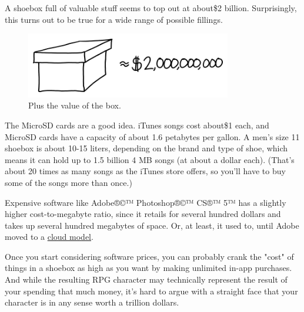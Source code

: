 {\hfill{}

{A shoebox full of valuable stuff seems to top out at about\$2 billion. Surprisingly, this turns out to be true for a wide range of possible fillings.}

\begin{figure}[!htbp]
\centering
\includegraphics[scale=0.5, max width=0.8\textwidth]{imgs/a/108/billion.png}
\caption{Plus the value of the box.}
\end{figure}

{The MicroSD cards are a good idea. iTunes songs cost about\$1 each, and MicroSD cards have a capacity of about 1.6 petabytes per gallon. A men's size 11 shoebox is about 10-15 liters, depending on the brand and type of shoe, which means it can hold up to 1.5 billion 4 MB songs (at about a dollar each). (That's about 20 times as many songs as the iTunes store offers, so you'll have to buy some of the songs more than once.)}

{Expensive software like Adobe®©™ Photoshop®©™ CS®™ 5™ has a slightly higher cost-to-megabyte ratio, since it retails for several hundred dollars and takes up several hundred megabytes of space. Or, at least, it used to, until Adobe moved to a \href{http://www.istockphoto.com/photo/your-own-cloud-20501613}{cloud model}.}

{Once you start considering software prices, you can probably crank the "cost" of things in a shoebox as high as you want by making unlimited in-app purchases. And while the resulting RPG character may technically represent the result of your spending that much money, it's hard to argue with a straight face that your character is in any sense worth a trillion dollars.}

}
